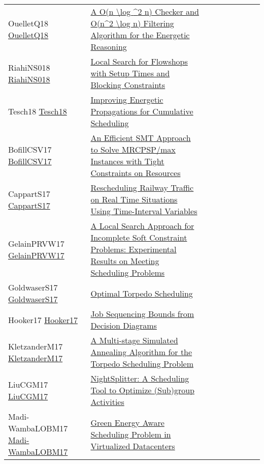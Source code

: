 {\begin{longtable}{p{3cm}p{7cm}lllllll}
OuelletQ18 \href{https://doi.org/10.1007/978-3-319-93031-2\_34}{OuelletQ18} &  \href{papers/OuelletQ18.pdf}{A O(n {\textbackslash}log {\^{}}2 n) Checker and O(n{\^{}}2 {\textbackslash}log n) Filtering Algorithm for the Energetic Reasoning} &  &  &  &  &  &  & \\
RiahiNS018 \href{https://aaai.org/ocs/index.php/ICAPS/ICAPS18/paper/view/17755}{RiahiNS018} &  \href{}{Local Search for Flowshops with Setup Times and Blocking Constraints} &  &  &  &  &  &  & \\
Tesch18 \href{https://doi.org/10.1007/978-3-319-98334-9\_41}{Tesch18} &  \href{papers/Tesch18.pdf}{Improving Energetic Propagations for Cumulative Scheduling} &  &  &  &  &  &  & \\
BofillCSV17 \href{https://doi.org/10.1007/978-3-319-66158-2\_5}{BofillCSV17} &  \href{papers/BofillCSV17.pdf}{An Efficient {SMT} Approach to Solve MRCPSP/max Instances with Tight Constraints on Resources} &  &  &  &  &  &  & \\
CappartS17 \href{https://doi.org/10.1007/978-3-319-59776-8\_26}{CappartS17} &  \href{papers/CappartS17.pdf}{Rescheduling Railway Traffic on Real Time Situations Using Time-Interval Variables} &  &  &  &  &  &  & \\
GelainPRVW17 \href{https://doi.org/10.1007/978-3-319-59776-8\_32}{GelainPRVW17} &  \href{papers/GelainPRVW17.pdf}{A Local Search Approach for Incomplete Soft Constraint Problems: Experimental Results on Meeting Scheduling Problems} &  &  &  &  &  &  & \\
GoldwaserS17 \href{https://doi.org/10.1007/978-3-319-66158-2\_22}{GoldwaserS17} &  \href{papers/GoldwaserS17.pdf}{Optimal Torpedo Scheduling} &  &  &  &  &  &  & \\
Hooker17 \href{https://doi.org/10.1007/978-3-319-66158-2\_36}{Hooker17} &  \href{papers/Hooker17.pdf}{Job Sequencing Bounds from Decision Diagrams} &  &  &  &  &  &  & \\
KletzanderM17 \href{https://doi.org/10.1007/978-3-319-59776-8\_28}{KletzanderM17} &  \href{papers/KletzanderM17.pdf}{A Multi-stage Simulated Annealing Algorithm for the Torpedo Scheduling Problem} &  &  &  &  &  &  & \\
LiuCGM17 \href{https://doi.org/10.1007/978-3-319-66158-2\_24}{LiuCGM17} &  \href{papers/LiuCGM17.pdf}{NightSplitter: {A} Scheduling Tool to Optimize (Sub)group Activities} &  &  &  &  &  &  & \\
Madi-WambaLOBM17 \href{https://doi.org/10.1109/ICPADS.2017.00089}{Madi-WambaLOBM17} &  \href{papers/Madi-WambaLOBM17.pdf}{Green Energy Aware Scheduling Problem in Virtualized Datacenters} &  &  &  &  &  &  & \\

\end{longtable}}
